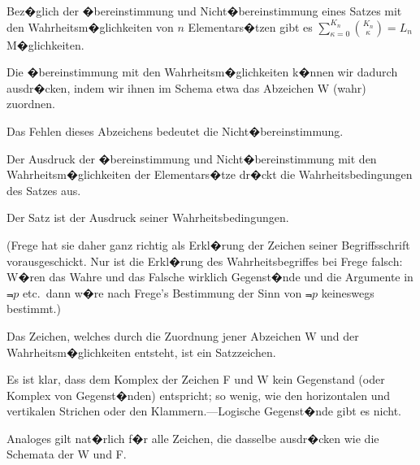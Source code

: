 {Bez�glich der �bereinstimmung und Nicht�bereinstimmung
eines Satzes mit den Wahrheitsm�glichkeiten
von $n$ Elementars�tzen gibt es
$\sum\limits_{\kappa = 0}^{K_n}\binom{K_n}{\kappa} = L_{n}$ M�glichkeiten.}


{Die �bereinstimmung mit den Wahrheitsm�glichkeiten
k�nnen wir dadurch ausdr�cken, indem
wir ihnen im Schema etwa das Abzeichen \glqq{}W\grqq{}
(wahr) zuordnen.

Das Fehlen dieses Abzeichens bedeutet die
Nicht�bereinstimmung.}


{Der Ausdruck der �bereinstimmung und Nicht�bereinstimmung
mit den Wahrheitsm�glichkeiten
der Elementars�tze dr�ckt die Wahrheitsbedingungen
des Satzes aus.

Der Satz ist der Ausdruck seiner Wahrheitsbedingungen.

(Frege hat sie daher ganz richtig als Erkl�rung
der Zeichen seiner Begriffsschrift vorausgeschickt.
Nur ist die Erkl�rung des Wahrheitsbegriffes bei
Frege falsch: W�ren \glqq{}das Wahre\grqq{} und \glqq{}das Falsche\grqq{}
wirklich Gegenst�nde und die Argumente in $\Not{p}$
etc.\ dann w�re nach Frege's Bestimmung der Sinn
von \glqq{}$\Not{p}$\grqq{} keineswegs bestimmt.)}


{Das Zeichen, welches durch die Zuordnung
jener Abzeichen \glqq{}W\grqq{} und der Wahrheitsm�glichkeiten
entsteht, ist ein Satzzeichen.}


{Es ist klar, dass dem Komplex der Zeichen
\glqq{}F\grqq{} und \glqq{}W\grqq{} kein Gegenstand (oder Komplex von
Gegenst�nden) entspricht; so wenig, wie den horizontalen
und vertikalen Strichen oder den Klammern.---\glqq{}Logische
Gegenst�nde\grqq{} gibt es nicht.

Analoges gilt nat�rlich f�r alle Zeichen, die dasselbe
ausdr�cken wie die Schemata der \glqq{}W\grqq{} und \glqq{}F\grqq{}.}


